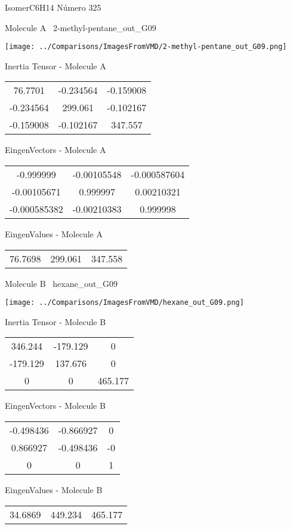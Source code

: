 \vtab[-3cm]
\begin{center}
{\large IsomerC6H14 \tab Número 325}
\end{center}
\begin{multicols}{2}
\begin{center}

Molecule A \
2-methyl-pentane\_out\_G09

\texttt{[image: ../Comparisons/ImagesFromVMD/2-methyl-pentane\_out\_G09.png]}

Inertia Tensor - Molecule A \\
\begin{tabular}{|c c c|}
76.7701	 & 	-0.234564	 & 	-0.159008	 \\
-0.234564	 & 	299.061	 & 	-0.102167	 \\
-0.159008	 & 	-0.102167	 & 	347.557
\end{tabular}

\vtab
 EingenVectors - Molecule A     \\
\begin{tabular}{|c c c|}
-0.999999	 & 	-0.00105548	 & 	-0.000587604	 \\
-0.00105671	 & 	0.999997	 & 	0.00210321	 \\
-0.000585382	 & 	-0.00210383	 & 	0.999998
\end{tabular}

\vtab
 EingenValues - Molecule A     \\
\begin{tabular}{|c c c|}
76.7698	 & 	299.061	 & 	347.558	 \\
\end{tabular}
\columnbreak

Molecule B \
hexane\_out\_G09

\texttt{[image: ../Comparisons/ImagesFromVMD/hexane\_out\_G09.png]}

Inertia Tensor - Molecule B \\
\begin{tabular}{|c c c|}
346.244	 & 	-179.129	 & 	0	 \\
-179.129	 & 	137.676	 & 	0	 \\
0	 & 	0	 & 	465.177
\end{tabular}

\vtab
 EingenVectors - Molecule B     \\
\begin{tabular}{|c c c|}
-0.498436	 & 	-0.866927	 & 	0	 \\
0.866927	 & 	-0.498436	 & 	-0	 \\
0	 & 	0	 & 	1
\end{tabular}

\vtab
 EingenValues - Molecule B     \\
\begin{tabular}{|c c c|}
34.6869	 & 	449.234	 & 	465.177	 \\
\end{tabular}

\end{center}
\end{multicols}

